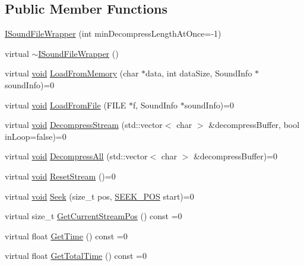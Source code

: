 \subsection*{Public Member Functions}
\begin{DoxyCompactItemize}
\item 
\mbox{\hyperlink{classnjli_1_1_i_sound_file_wrapper_a9d584c730a105374c50f9d4e435c6ca4}{I\+Sound\+File\+Wrapper}} (int min\+Decompress\+Length\+At\+Once=-\/1)
\item 
virtual \mbox{\hyperlink{classnjli_1_1_i_sound_file_wrapper_a1d45f4bcf0e8229bc57907f22ce01ab7}{$\sim$\+I\+Sound\+File\+Wrapper}} ()
\item 
virtual \mbox{\hyperlink{_thread_8h_af1e856da2e658414cb2456cb6f7ebc66}{void}} \mbox{\hyperlink{classnjli_1_1_i_sound_file_wrapper_a2c4dc8cc613f8f545b0e1ead86ee7e4d}{Load\+From\+Memory}} (char $\ast$data, int data\+Size, Sound\+Info $\ast$sound\+Info)=0
\item 
virtual \mbox{\hyperlink{_thread_8h_af1e856da2e658414cb2456cb6f7ebc66}{void}} \mbox{\hyperlink{classnjli_1_1_i_sound_file_wrapper_a525f86e4bbe65d5b90ee3eda171b5492}{Load\+From\+File}} (F\+I\+LE $\ast$f, Sound\+Info $\ast$sound\+Info)=0
\item 
virtual \mbox{\hyperlink{_thread_8h_af1e856da2e658414cb2456cb6f7ebc66}{void}} \mbox{\hyperlink{classnjli_1_1_i_sound_file_wrapper_a2e62b8b05da06eb1f9594ffdd5aa0cfd}{Decompress\+Stream}} (std\+::vector$<$ char $>$ \&decompress\+Buffer, bool in\+Loop=false)=0
\item 
virtual \mbox{\hyperlink{_thread_8h_af1e856da2e658414cb2456cb6f7ebc66}{void}} \mbox{\hyperlink{classnjli_1_1_i_sound_file_wrapper_a9b338a5bbcb5d07acdebce1efab332c5}{Decompress\+All}} (std\+::vector$<$ char $>$ \&decompress\+Buffer)=0
\item 
virtual \mbox{\hyperlink{_thread_8h_af1e856da2e658414cb2456cb6f7ebc66}{void}} \mbox{\hyperlink{classnjli_1_1_i_sound_file_wrapper_ab302d724c78a9a55f6dcb288d31e6854}{Reset\+Stream}} ()=0
\item 
virtual \mbox{\hyperlink{_thread_8h_af1e856da2e658414cb2456cb6f7ebc66}{void}} \mbox{\hyperlink{classnjli_1_1_i_sound_file_wrapper_a22241a77b7d6adf55045a7a30ec5ef30}{Seek}} (size\+\_\+t pos, \mbox{\hyperlink{classnjli_1_1_i_sound_file_wrapper_ab4b07720cb2823b4f3f9fa98ee07a6e7}{S\+E\+E\+K\+\_\+\+P\+OS}} start)=0
\item 
virtual size\+\_\+t \mbox{\hyperlink{classnjli_1_1_i_sound_file_wrapper_a7468aaf1e53cfd6feb38eae4ecf8ab99}{Get\+Current\+Stream\+Pos}} () const =0
\item 
virtual float \mbox{\hyperlink{classnjli_1_1_i_sound_file_wrapper_afefb180620c4a6e17e994a867726eb29}{Get\+Time}} () const =0
\item 
virtual float \mbox{\hyperlink{classnjli_1_1_i_sound_file_wrapper_a1b22318560969f7cc06ac03dcb78971f}{Get\+Total\+Time}} () const =0
\end{DoxyCompactItemize}



